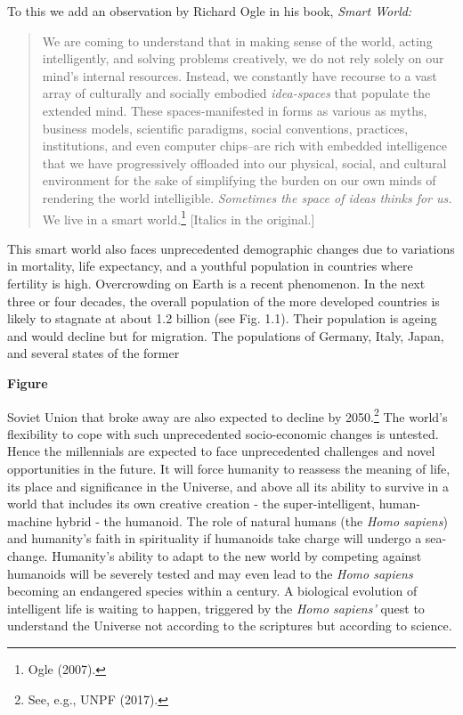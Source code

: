 \begin{multicols}{2}
To this we add an observation by Richard Ogle in his book, \textit{Smart World:}
\begin{quote}
We are coming to understand that in making sense of the world, acting intelligently, and solving problems creatively, we do not rely solely on our mind's internal resources. Instead, we constantly have recourse to a vast array of culturally and socially embodied \textit{idea-spaces} that populate the extended mind. These spaces-manifested in forms as various as myths, business models, scientific paradigms, social conventions, practices, institutions, and even computer chips--are rich with embedded intelligence that we have progressively offloaded into our physical, social, and cultural environment for the sake of simplifying the burden on our own minds of rendering the world intelligible. \textit{Sometimes the space of ideas thinks for us.} We live in a smart world.\footnote{Ogle (2007).} [Italics in the original.] 
\end{quote}

This smart world also faces unprecedented demographic changes due to variations in mortality, life expectancy, and a youthful population in countries where fertility is high. Overcrowding on Earth is a recent phenomenon. In the next three or four decades, the overall population of the more developed countries is likely to stagnate at about 1.2 billion (see Fig. 1.1). Their population is ageing and would decline but for migration. The populations of Germany, Italy, Japan, and several states of the former 
\begin{center}
{\bf Figure}
\end{center}

Soviet Union that broke away are also expected to decline by 2050.\footnote{See, e.g., UNPF (2017).} The world's flexibility to cope with such unprecedented socio-economic changes is untested. Hence the millennials are expected to face unprecedented challenges and novel opportunities in the future. It will force humanity to reassess the meaning of life, its place and significance in the Universe, and above all its ability to survive in a world that includes its own creative creation - the super-intelligent, human-machine hybrid - the humanoid. The role of natural humans (the \textit{Homo sapiens}) and humanity's faith in spirituality if humanoids take charge will undergo a sea-change. Humanity's ability to adapt to the new world by competing against humanoids will be severely tested and may even lead to the \textit{Homo sapiens} becoming an endangered species within a century. A biological evolution of intelligent life is waiting to happen, triggered by the \textit{Homo sapiens'} quest to understand the Universe not according to the scriptures but according to science.


\end{multicols}
